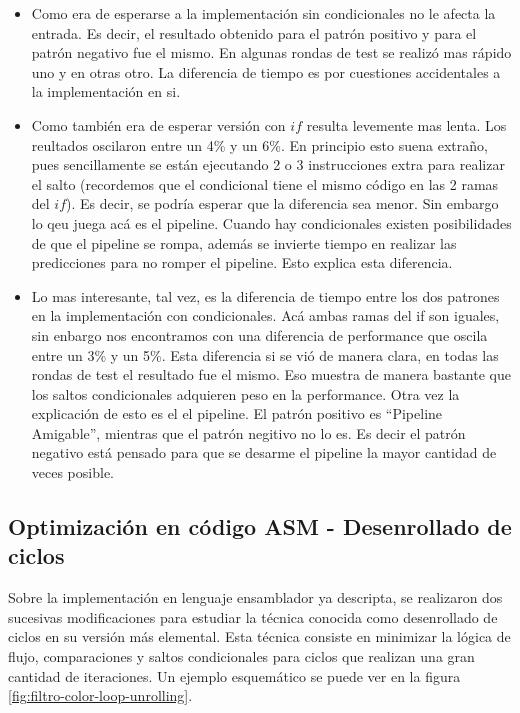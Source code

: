 \begin{itemize}

	\item Como era de esperarse a la implementación sin condicionales no
le afecta la entrada. Es decir, el resultado obtenido para el patrón
positivo y para el patrón negativo fue el mismo. En algunas rondas de
test se realizó mas rápido uno y en otras otro. La diferencia de tiempo
es por cuestiones accidentales a la implementación en si.
	\item Como también era de esperar versión con $if$ resulta levemente
mas lenta. Los reultados oscilaron entre un 4\% y un 6\%. En principio
esto suena extraño, pues sencillamente se están ejecutando 2 o 3 instrucciones
extra para realizar el salto (recordemos que el condicional tiene el mismo código
en las 2 ramas del $if$). Es decir, se podría esperar que la diferencia sea menor.
Sin embargo lo qeu juega acá es el pipeline. Cuando hay condicionales
existen posibilidades de que el pipeline se rompa, además se invierte tiempo
en realizar las predicciones para no romper el pipeline. Esto explica esta diferencia.
	\item Lo mas interesante, tal vez, es la diferencia de tiempo entre
los dos patrones en la implementación con condicionales. Acá ambas ramas
del if son iguales, sin enbargo nos encontramos con una diferencia de performance que oscila
entre un 3\% y un 5\%. Esta diferencia si se vió de manera clara, en todas
las rondas de test el resultado fue el mismo. Eso muestra de manera bastante
que los saltos condicionales adquieren peso en la performance. Otra vez
la explicación de esto es el el pipeline. El patrón positivo es ``Pipeline Amigable'',
mientras que el patrón negitivo no lo es. Es decir el patrón negativo está pensado
para que se desarme el pipeline la mayor cantidad de veces posible.


\end{itemize}


\newpage

\subsection{Optimización en código ASM - Desenrollado de ciclos}
\label{sub:filtro-color-optimizaciones-asm}

Sobre la implementación en lenguaje ensamblador ya descripta, se realizaron dos sucesivas modificaciones para estudiar la técnica conocida como desenrollado de ciclos en su versión más elemental. Esta técnica consiste en minimizar la lógica de flujo, comparaciones y saltos condicionales para ciclos que realizan una gran cantidad de iteraciones. Un ejemplo esquemático se puede ver en la figura \ref{fig:filtro-color-loop-unrolling}.

